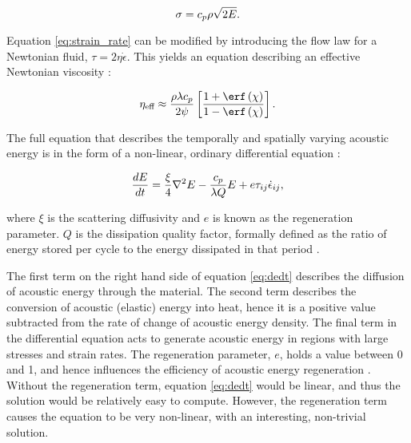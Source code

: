 \begin{equation}
\sigma = c_{p} \rho \sqrt{2 E}.\vspace{0.2cm}
\end{equation}

Equation \ref{eq:strain_rate} can be modified by introducing the flow law for a Newtonian fluid, $\tau = 2 \eta \dot{\epsilon}$. This yields an equation describing an effective Newtonian viscosity \citep{collins2003acoustic}:

\begin{equation} \label{eq:eff_vis}
\eta_{\text{eff}} \approx \frac{\rho \lambda c_{p}}{2 \psi} \left[ \frac{1+\erf\left(\chi\right)}{1-\erf\left(\chi\right)} \right].\vspace{0.2cm}
\end{equation}

The full equation that describes the temporally and spatially varying acoustic energy is in the form of a non-linear, ordinary differential equation \citep{melosh1996dynamical}:

\begin{equation} \label{eq:dedt}
\frac{d E}{d t} = \frac{\xi}{4} \nabla^{2}E - \frac{c_{p}}{\lambda Q}E + e \tau_{ij} \dot{\epsilon}_{ij},\vspace{0.2cm}
\end{equation} 

where $\xi$ is the scattering diffusivity and $e$ is known as the regeneration parameter. $Q$ is the dissipation quality factor, formally defined as the  ratio of energy stored per cycle to the energy dissipated in that period \citep{collins2003acoustic,melosh1996dynamical}.\bigskip

The first term on the right hand side of equation \ref{eq:dedt} describes the diffusion of acoustic energy through the material. The second term describes the conversion of acoustic (elastic) energy into heat, hence it is a positive value subtracted from the rate of change of acoustic energy density. The final term in the differential equation acts to generate acoustic energy in regions with large stresses and strain rates. The regeneration parameter, $e$, holds a value between 0 and 1, and hence influences the efficiency of acoustic energy regeneration \citep{melosh1996dynamical}. Without the regeneration term, equation \ref{eq:dedt} would be linear, and thus the solution would be relatively easy to compute. However, the regeneration term causes the equation to be very non-linear, with an interesting, non-trivial solution.\bigskip

